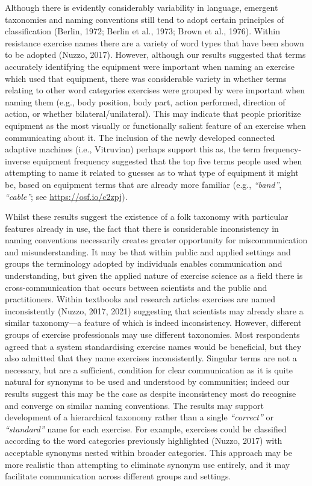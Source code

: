 \documentclass[
]{article}
\begin{document}
Although there is evidently considerably variability in language,
emergent taxonomies and naming conventions still tend to adopt certain
principles of classification (Berlin, 1972; Berlin et al., 1973; Brown
et al., 1976). Within resistance exercise names there are a variety of
word types that have been shown to be adopted (Nuzzo, 2017). However,
although our results suggested that terms accurately identifying the
equipment were important when naming an exercise which used that
equipment, there was considerable variety in whether terms relating to
other word categories exercises were grouped by were important when
naming them (e.g., body position, body part, action performed, direction
of action, or whether bilateral/unilateral). This may indicate that
people prioritize equipment as the most visually or functionally salient
feature of an exercise when communicating about it. The inclusion of the
newly developed connected adaptive machines (i.e., Vitruvian) perhaps
support this as, the term frequency-inverse equipment frequency
suggested that the top five terms people used when attempting to name it
related to guesses as to what type of equipment it might be, based on
equipment terms that are already more familiar (e.g., \emph{``band''},
\emph{``cable''}; see \url{https://osf.io/c2zpj}).

Whilst these results suggest the existence of a folk taxonomy with
particular features already in use, the fact that there is considerable
inconsistency in naming conventions necessarily creates greater
opportunity for miscommunication and misunderstanding. It may be that
within public and applied settings and groups the terminology adopted by
individuals enables communication and understanding, but given the
applied nature of exercise science as a field there is
cross-communication that occurs between scientists and the public and
practitioners. Within textbooks and research articles exercises are
named inconsistently (Nuzzo, 2017, 2021) suggesting that scientists may
already share a similar taxonomy---a feature of which is indeed
inconsistency. However, different groups of exercise professionals may
use different taxonomies. Most respondents agreed that a system
standardising exercise names would be beneficial, but they also admitted
that they name exercises inconsistently. Singular terms are not a
necessary, but are a sufficient, condition for clear communication as it
is quite natural for synonyms to be used and understood by communities;
indeed our results suggest this may be the case as despite inconsistency
most do recognise and converge on similar naming conventions. The
results may support development of a hierarchical taxonomy rather than a
single \emph{``correct''} or \emph{``standard''} name for each exercise.
For example, exercises could be classified according to the word
categories previously highlighted (Nuzzo, 2017) with acceptable synonyms
nested within broader categories. This approach may be more realistic
than attempting to eliminate synonym use entirely, and it may facilitate
communication across different groups and settings.
\end{document}

